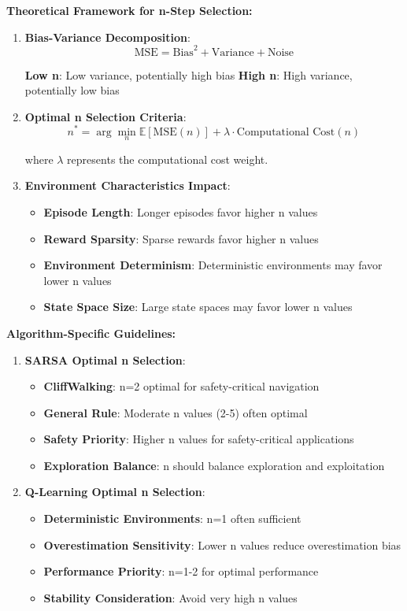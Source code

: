 \documentclass[12pt]{article}
\begin{document}
{{{\textbf{Theoretical Framework for n-Step Selection:}

\begin{enumerate}
    \item \textbf{Bias-Variance Decomposition}:
    $$\text{MSE} = \text{Bias}^2 + \text{Variance} + \text{Noise}$$
    
    \textbf{Low n}: Low variance, potentially high bias
    \textbf{High n}: High variance, potentially low bias
    
    \item \textbf{Optimal n Selection Criteria}:
    $$n^* = \arg\min_n \mathbb{E}[\text{MSE}(n)] + \lambda \cdot \text{Computational Cost}(n)$$
    
    where $\lambda$ represents the computational cost weight.
    
    \item \textbf{Environment Characteristics Impact}:
    \begin{itemize}
        \item \textbf{Episode Length}: Longer episodes favor higher n values
        \item \textbf{Reward Sparsity}: Sparse rewards favor higher n values
        \item \textbf{Environment Determinism}: Deterministic environments may favor lower n values
        \item \textbf{State Space Size}: Large state spaces may favor lower n values
    \end{itemize}
\end{enumerate}

\textbf{Algorithm-Specific Guidelines:}

\begin{enumerate}
    \item \textbf{SARSA Optimal n Selection}:
    \begin{itemize}
        \item \textbf{CliffWalking}: n=2 optimal for safety-critical navigation
        \item \textbf{General Rule}: Moderate n values (2-5) often optimal
        \item \textbf{Safety Priority}: Higher n values for safety-critical applications
        \item \textbf{Exploration Balance}: n should balance exploration and exploitation
    \end{itemize}
    
    \item \textbf{Q-Learning Optimal n Selection}:
    \begin{itemize}
        \item \textbf{Deterministic Environments}: n=1 often sufficient
        \item \textbf{Overestimation Sensitivity}: Lower n values reduce overestimation bias
        \item \textbf{Performance Priority}: n=1-2 for optimal performance
        \item \textbf{Stability Consideration}: Avoid very high n values
    \end{itemize}
\end{enumerate}

}}}
\end{document}
